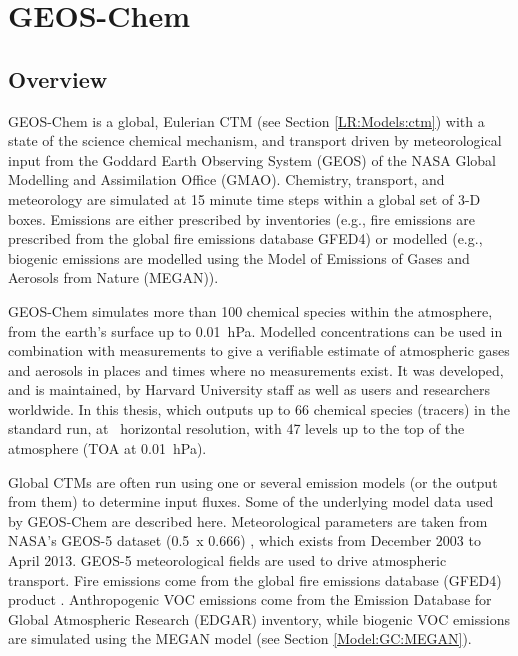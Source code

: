 \section{GEOS-Chem}
\label{Model:GC}

  \subsection{Overview}
    GEOS-Chem is a global, Eulerian CTM (see Section \ref{LR:Models:ctm}) with a state of the science chemical mechanism, and transport driven by meteorological input from the Goddard Earth Observing System (GEOS) of the NASA Global Modelling and Assimilation Office (GMAO).
    Chemistry, transport, and meteorology are simulated at 15 minute time steps within a global set of 3-D boxes.
    Emissions are either prescribed by inventories (e.g., fire emissions are prescribed from the global fire emissions database GFED4) or modelled (e.g., biogenic emissions are modelled using the Model of Emissions of Gases and Aerosols from Nature (MEGAN)).
    
    GEOS-Chem simulates more than 100 chemical species within the atmosphere, from the earth's surface up to 0.01~hPa.
    Modelled concentrations can be used in combination with measurements to give a verifiable estimate of atmospheric gases and aerosols in places and times where no measurements exist.
    It was developed, and is maintained, by Harvard University staff as well as users and researchers worldwide.
    In this thesis, which outputs up to 66 chemical species (tracers) in the standard run, at \lowhr ~horizontal resolution, with 47 levels up to the top of the atmosphere (TOA at 0.01~hPa).
    
    
    Global CTMs are often run using one or several emission models (or the output from them) to determine input fluxes.
    Some of the underlying model data used by GEOS-Chem are described here.
    Meteorological parameters are taken from NASA's GEOS-5 dataset (0.5\degr ~x 0.666\degr) \parencite{Chen2009}, which exists from December 2003 to April 2013.
    GEOS-5 meteorological fields are used to drive atmospheric transport.
    Fire emissions come from the global fire emissions database (GFED4) product \parencite{Giglio2013}. 
    Anthropogenic VOC emissions come from the Emission Database for Global Atmospheric Research (EDGAR) inventory, while biogenic VOC emissions are simulated using the MEGAN model (see Section \ref{Model:GC:MEGAN}).



